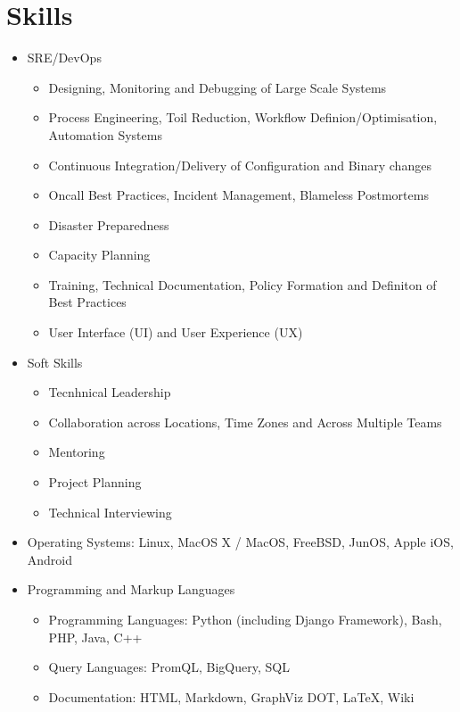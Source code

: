 \documentclass[a4paper, 10pt] {article}
\begin{document}
\section*{Skills}

\begin{itemize}
\item SRE/DevOps
  \begin{itemize}
  \item Designing, Monitoring and Debugging of Large Scale Systems
  \item Process Engineering, Toil Reduction, Workflow Definion/Optimisation, Automation Systems
  \item Continuous Integration/Delivery of Configuration and Binary changes
  \item Oncall Best Practices, Incident Management, Blameless Postmortems
  \item Disaster Preparedness
  \item Capacity Planning
  \item Training, Technical Documentation, Policy Formation and Definiton of Best Practices
  \item User Interface (UI) and User Experience (UX)
  \end{itemize}
\item Soft Skills
  \begin{itemize}
  \item Tecnhnical Leadership
  \item Collaboration across Locations, Time Zones and Across Multiple Teams
  \item Mentoring
  \item Project Planning
  \item Technical Interviewing
  \end{itemize}
  \item Operating Systems: Linux, MacOS X / MacOS, FreeBSD, JunOS, Apple iOS, Android
\item Programming and Markup Languages
  \begin{itemize}
  \item Programming Languages: Python (including Django Framework), Bash, PHP, Java, C++
  \item Query Languages: PromQL, BigQuery, SQL
  \item Documentation: HTML, Markdown, GraphViz DOT, LaTeX, Wiki
  \end{itemize}
\end{itemize}  
\end{document}
